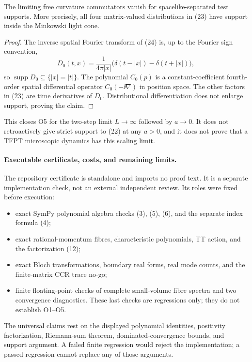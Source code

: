 \begin{theorem}
The limiting free curvature commutators vanish for spacelike-separated test
supports.  More precisely, all four matrix-valued distributions in (23) have
support inside the Minkowski light cone.
\end{theorem}

\begin{proof}
The inverse spatial Fourier transform of (24) is, up to the Fourier sign
convention,
\[
 D_0(t,x)=\frac{1}{4\pi|x|}
 \bigl(\delta(t-|x|)-\delta(t+|x|)\bigr),           \tag{25}
\]
so $\operatorname{supp}D_0\subseteq\{|x|=|t|\}$.  The polynomial
$C_0(p)$ is a constant-coefficient fourth-order spatial differential operator
$C_0(-\ii\nabla)$ in position space.  The other factors in (23) are time
derivatives of $D_0$.  Distributional differentiation does not enlarge
support, proving the claim.
\end{proof}

This closes O5 for the two-step limit $L\to\infty$ followed by $a\to0$.
It does not retroactively give strict support to (22) at any $a>0$, and it does
not prove that a TFPT microscopic dynamics has this scaling limit.

\paragraph{Executable certificate, costs, and remaining limits.}

The repository certificate  is standalone and
imports no proof text.  It is a separate implementation check, not an
external independent review.  Its roles were fixed before execution:
\begin{itemize}[leftmargin=2em]
\item exact SymPy polynomial algebra checks (3), (5), (6), and the separate
index formula (4);
\item exact rational-momentum fibres, characteristic polynomials, TT action,
and the factorization (12);
\item exact Bloch transformations, boundary real forms, real mode counts, and
the finite-matrix CCR trace no-go;
\item finite floating-point checks of complete small-volume fibre spectra and
two convergence diagnostics.  These last checks are regressions only; they do
not establish O1--O5.
\end{itemize}
The universal claims rest on the displayed polynomial identities, positivity
factorization, Riemann-sum theorem, dominated-convergence bounds, and support
argument.  A failed finite regression would reject the implementation; a
passed regression cannot replace any of those arguments.

